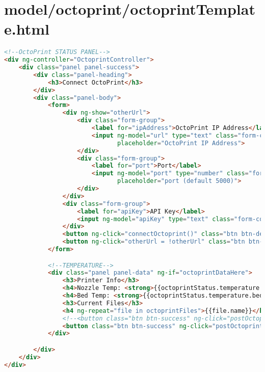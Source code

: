 \section{model/octoprint/octoprintTemplate.html}
\begin{lstlisting}[language=HTML, label={lst:octoprintTemplate}, caption=HTML structure which represents the view of the octoprint integration.]
<!--OctoPrint STATUS PANEL-->
<div ng-controller="OctoprintController">
    <div class="panel panel-success">
        <div class="panel-heading">
            <h3>Connect OctoPrint</h3>
        </div>
        <div class="panel-body">
            <form>
                <div ng-show="otherUrl">
                    <div class="form-group">
                        <label for="ipAddress">OctoPrint IP Address</label>
                        <input ng-model="url" type="text" class="form-control" id="ipAddress"
                               placeholder="OctoPrint IP Address">
                    </div>
                    <div class="form-group">
                        <label for="port">Port</label>
                        <input ng-model="port" type="number" class="form-control" id="port"
                               placeholder="port (default 5000)">
                    </div>
                </div>
                <div class="form-group">
                    <label for="apiKey">API Key</label>
                    <input ng-model="apiKey" type="text" class="form-control" id="apiKey" placeholder="API Key">
                </div>
                <button ng-click="connectOctoprint()" class="btn btn-default">Connect</button>
                <button ng-click="otherUrl = !otherUrl" class="btn btn-primary">Custom Address?</button>
            </form>

            <!--TEMPERATURE-->
            <div class="panel panel-data" ng-if="octoprintDataHere">
                <h3>Printer Info</h3>
                <h4>Nozzle Temp: <strong>{{octoprintStatus.temperature.tool0.actual}}</strong> &#8451;</h4>
                <h4>Bed Temp: <strong>{{octoprintStatus.temperature.bed.actual}}</strong> &#8451;</h4>
                <h3>Current Files</h3>
                <h4 ng-repeat="file in octoprintFiles">{{file.name}}</h4>
                <!--<button class="btn btn-success" ng-click="postOctoprintFile()" ng-if="gcode.gcode"></button>-->
                <button class="btn btn-success" ng-click="postOctoprintFile()"></button>
            </div>

        </div>
    </div>
</div>
\end{lstlisting}


